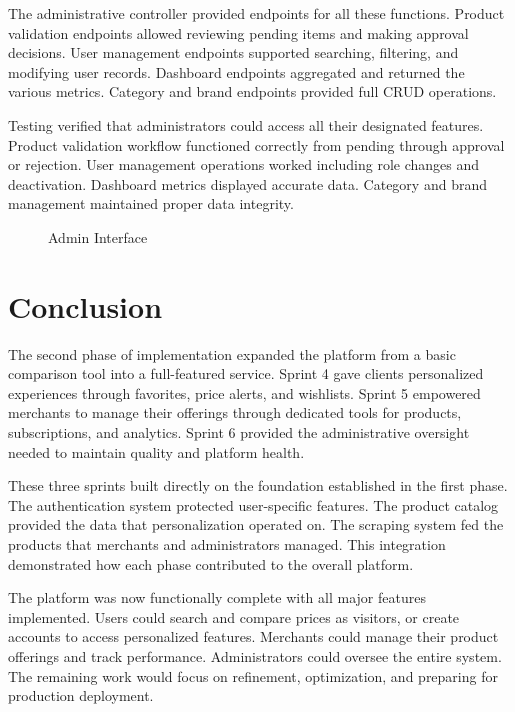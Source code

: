 The administrative controller provided endpoints for all these
functions. Product validation endpoints allowed reviewing pending
items and making approval decisions. User management endpoints
supported searching, filtering, and modifying user records.
Dashboard endpoints aggregated and returned the various metrics.
Category and brand endpoints provided full CRUD operations.

Testing verified that administrators could access all their
designated features. Product validation workflow functioned
correctly from pending through approval or rejection. User
management operations worked including role changes and
deactivation. Dashboard metrics displayed accurate data. Category
and brand management maintained proper data integrity.

\begin{figure}[H]
\begin{center}
\end{center}
\caption{Admin Interface}
\label{fig:admin_interface}
\end{figure}

\section*{Conclusion}

The second phase of implementation expanded the platform from
a basic comparison tool into a full-featured service. Sprint 4
gave clients personalized experiences through favorites, price
alerts, and wishlists. Sprint 5 empowered merchants to manage
their offerings through dedicated tools for products, subscriptions,
and analytics. Sprint 6 provided the administrative oversight
needed to maintain quality and platform health.

These three sprints built directly on the foundation established
in the first phase. The authentication system protected user-specific
features. The product catalog provided the data that personalization
operated on. The scraping system fed the products that merchants
and administrators managed. This integration demonstrated how
each phase contributed to the overall platform.

The platform was now functionally complete with all major
features implemented. Users could search and compare prices as
visitors, or create accounts to access personalized features.
Merchants could manage their product offerings and track performance.
Administrators could oversee the entire system. The remaining
work would focus on refinement, optimization, and preparing
for production deployment.